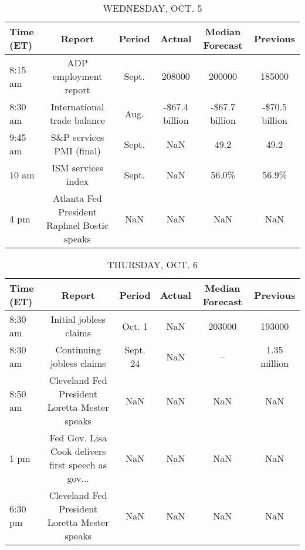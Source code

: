 \documentclass{article}%
\begin{document}
%


\begin{table}[htbp]%
\caption{WEDNESDAY, OCT. 5}%
\centering%
\begin{adjustbox}{width=1\textwidth}%
\begin{tabular}{lccccc}
\toprule
Time (ET) &                                      Report & Period &         Actual & Median Forecast &       Previous \\
\midrule
  8:15 am &                       ADP employment report &  Sept. &         208000 &          200000 &         185000 \\
  8:30 am &                 International trade balance &   Aug. & -\$67.4 billion &  -\$67.7 billion & -\$70.5 billion \\
  9:45 am &                    S\&P services PMI (final) &  Sept. &            NaN &            49.2 &           49.2 \\
    10 am &                          ISM services index &  Sept. &            NaN &           56.0\% &          56.9\% \\
     4 pm & Atlanta Fed President Raphael Bostic speaks &    NaN &            NaN &             NaN &            NaN \\
\bottomrule
\end{tabular}
%
\end{adjustbox}%
\end{table}

%


\begin{table}[htbp]%
\caption{THURSDAY, OCT. 6}%
\centering%
\begin{adjustbox}{width=1\textwidth}%
\begin{tabular}{lccccc}
\toprule
Time (ET) &                                             Report &   Period & Actual & Median Forecast &     Previous \\
\midrule
  8:30 am &                             Initial jobless claims &   Oct. 1 &    NaN &          203000 &       193000 \\
  8:30 am &                          Continuing jobless claims & Sept. 24 &    NaN &              -- & 1.35 million \\
  8:50 am &      Cleveland Fed President Loretta Mester speaks &      NaN &    NaN &             NaN &          NaN \\
     1 pm & Fed Gov. Lisa Cook delivers first speech as gov... &      NaN &    NaN &             NaN &          NaN \\
  6:30 pm &      Cleveland Fed President Loretta Mester speaks &      NaN &    NaN &             NaN &          NaN \\
\bottomrule
\end{tabular}
%
\end{adjustbox}%
\end{table}
\end{document}
